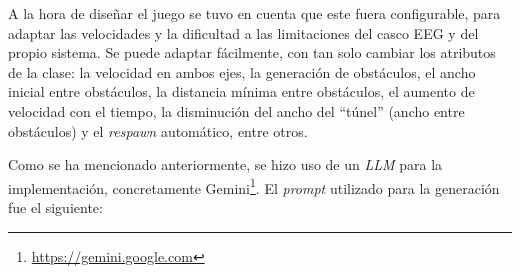 A la hora de diseñar el juego se tuvo en cuenta que este fuera configurable, para adaptar las velocidades y la dificultad a las limitaciones del casco EEG y del propio sistema. Se puede adaptar fácilmente, con tan solo cambiar los atributos de la clase: la velocidad en ambos ejes, la generación de obstáculos, el ancho inicial entre obstáculos, la distancia mínima entre obstáculos, el aumento de velocidad con el tiempo, la disminución del ancho del ``túnel'' (ancho entre obstáculos) y el \textit{respawn} automático, entre otros.

Como se ha mencionado anteriormente, se hizo uso de un \textit{LLM} para la implementación, concretamente Gemini\footnote{\url{https://gemini.google.com}}. El \textit{prompt} utilizado para la generación fue el siguiente:

\begingroup %

\emergencystretch=0pt

